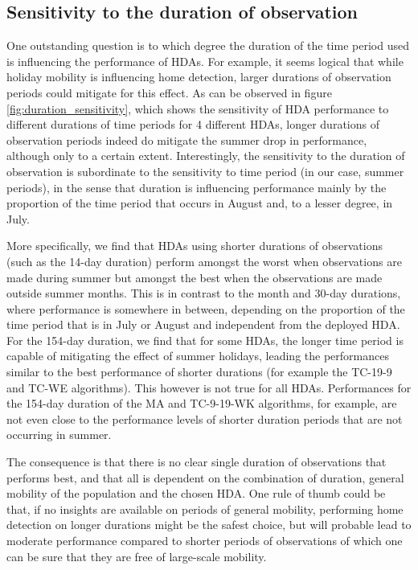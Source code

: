 \documentclass[a4paper]{article}
\begin{document}
\subsection{Sensitivity to the duration of observation}

One outstanding question is to which degree the duration of the time period used is influencing the performance of HDAs. For example, it seems logical that while holiday mobility is influencing home detection, larger durations of observation periods could mitigate for this effect. As can be observed in figure \ref{fig:duration_sensitivity}, which shows the sensitivity of HDA performance to different durations of time periods for 4 different HDAs, longer durations of observation periods indeed do mitigate the summer drop in performance, although only to a certain extent. Interestingly, the sensitivity to the duration of observation is subordinate to the sensitivity to time period (in our case, summer periods), in the sense that duration is influencing performance mainly by the proportion of the time period that occurs in August and, to a lesser degree, in July. 

More specifically, we find that HDAs using shorter durations of observations (such as the 14-day duration) perform amongst the worst when observations are made during summer but amongst the best when the observations are made outside summer months. This is in contrast to the month and 30-day durations, where performance is somewhere in between, depending on the proportion of the time period that is in July or August and independent from the deployed HDA. For the 154-day duration, we find that for some HDAs, the longer time period is capable of mitigating the effect of summer holidays, leading the performances similar to the best performance of shorter durations (for example the TC-19-9 and TC-WE algorithms). This however is not true for all HDAs. Performances for the 154-day duration of the MA and TC-9-19-WK algorithms, for example, are not even close to the performance levels of shorter duration periods that are not occurring in summer. 

The consequence is that there is no clear single duration of observations that performs best, and that all is dependent on the combination of duration, general mobility of the population and the chosen HDA. One rule of thumb could be that, if no insights are available on periods of general mobility, performing home detection on longer durations might be the safest choice, but will probable lead to moderate performance compared to shorter periods of observations of which one can be sure that they are free of large-scale mobility. 
\end{document}
